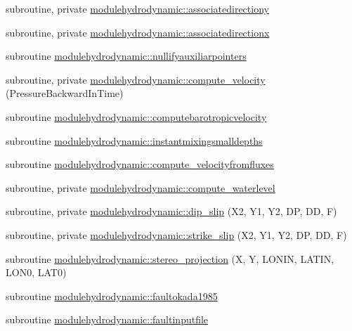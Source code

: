 \begin{DoxyCompactItemize}
\item 
subroutine, private \mbox{\hyperlink{namespacemodulehydrodynamic_ad1dd8c0a50f0deaee0d084b9938b1361}{modulehydrodynamic\+::associatedirectiony}}
\item 
subroutine, private \mbox{\hyperlink{namespacemodulehydrodynamic_a46e9869092f2ae2a7161f224fb8929e7}{modulehydrodynamic\+::associatedirectionx}}
\item 
subroutine \mbox{\hyperlink{namespacemodulehydrodynamic_a43c5994c86b411881eec077d6376cb07}{modulehydrodynamic\+::nullifyauxiliarpointers}}
\item 
subroutine, private \mbox{\hyperlink{namespacemodulehydrodynamic_aba4d9045d33fdc1b7b6011fd3fbb9c28}{modulehydrodynamic\+::compute\+\_\+velocity}} (Pressure\+Backward\+In\+Time)
\item 
subroutine \mbox{\hyperlink{namespacemodulehydrodynamic_a4ced11a2f90a07418b9497e7e9b068b7}{modulehydrodynamic\+::computebarotropicvelocity}}
\item 
subroutine \mbox{\hyperlink{namespacemodulehydrodynamic_a2237f44be04f4c5aeac0890ddec1ce4b}{modulehydrodynamic\+::instantmixingsmalldepths}}
\item 
subroutine \mbox{\hyperlink{namespacemodulehydrodynamic_a264a587e27769271754a3a3a8979a9b8}{modulehydrodynamic\+::compute\+\_\+velocityfromfluxes}}
\item 
subroutine, private \mbox{\hyperlink{namespacemodulehydrodynamic_abe745b3932a59db4111fe2798a0c335d}{modulehydrodynamic\+::compute\+\_\+waterlevel}}
\item 
subroutine, private \mbox{\hyperlink{namespacemodulehydrodynamic_a95f2fab061ef070b4278d48f1e7028e2}{modulehydrodynamic\+::dip\+\_\+slip}} (X2, Y1, Y2, DP, DD, F)
\item 
subroutine, private \mbox{\hyperlink{namespacemodulehydrodynamic_a38a2568403edbdf1d10000f553f39252}{modulehydrodynamic\+::strike\+\_\+slip}} (X2, Y1, Y2, DP, DD, F)
\item 
subroutine \mbox{\hyperlink{namespacemodulehydrodynamic_a1d685e489f857af3dd0c69835d0b081d}{modulehydrodynamic\+::stereo\+\_\+projection}} (X, Y, L\+O\+N\+IN, L\+A\+T\+IN, L\+O\+N0, L\+A\+T0)
\item 
subroutine \mbox{\hyperlink{namespacemodulehydrodynamic_af90f1292b4b75aa67f18563e3030e056}{modulehydrodynamic\+::faultokada1985}}
\item 
subroutine \mbox{\hyperlink{namespacemodulehydrodynamic_a639b9213d8587d0f1a43c4b8f842d43f}{modulehydrodynamic\+::faultinputfile}}
\item 

\end{DoxyCompactItemize}
